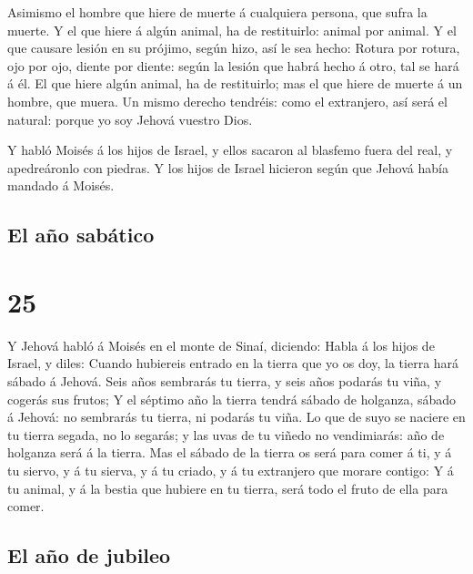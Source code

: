  Asimismo el hombre que hiere de muerte á cualquiera
persona, que sufra la muerte.  Y el que hiere á algún
animal, ha de restituirlo: animal por animal.  Y el que
causare lesión en su prójimo, según hizo, así le sea hecho:
 Rotura por rotura, ojo por ojo, diente por diente: según
la lesión que habrá hecho á otro, tal se hará á él.  El
que hiere algún animal, ha de restituirlo; mas el que hiere de muerte á
un hombre, que muera.  Un mismo derecho tendréis: como el
extranjero, así será el natural: porque yo soy Jehová vuestro Dios.

 Y habló Moisés á los hijos de Israel, y ellos sacaron al
blasfemo fuera del real, y apedreáronlo con piedras. Y los hijos de
Israel hicieron según que Jehová había mandado á Moisés.

\hypertarget{el-auxf1o-sabuxe1tico}{%
\subsection{El año sabático}\label{el-auxf1o-sabuxe1tico}}

\hypertarget{section-03-25}{%
\section{25}\label{section-03-25}}

 Y Jehová habló á Moisés en el monte de Sinaí, diciendo:
 Habla á los hijos de Israel, y diles: Cuando hubiereis
entrado en la tierra que yo os doy, la tierra hará sábado á Jehová.
 Seis años sembrarás tu tierra, y seis años podarás tu
viña, y cogerás sus frutos;  Y el séptimo año la tierra
tendrá sábado de holganza, sábado á Jehová: no sembrarás tu tierra, ni
podarás tu viña.  Lo que de suyo se naciere en tu tierra
segada, no lo segarás; y las uvas de tu viñedo no vendimiarás: año de
holganza será á la tierra.  Mas el sábado de la tierra os
será para comer á ti, y á tu siervo, y á tu sierva, y á tu criado, y á
tu extranjero que morare contigo:  Y á tu animal, y á la
bestia que hubiere en tu tierra, será todo el fruto de ella para comer.

\hypertarget{el-auxf1o-de-jubileo}{%
\subsection{El año de jubileo}\label{el-auxf1o-de-jubileo}}

